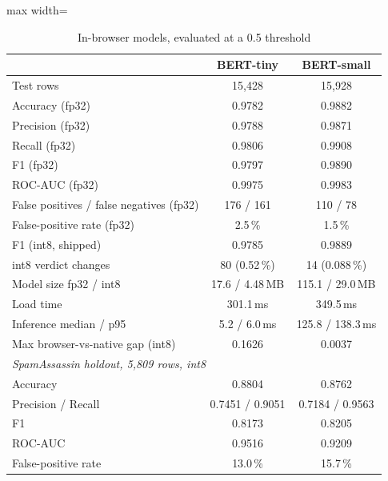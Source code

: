 \documentclass[conference]{IEEEtran}
\begin{document}
\begin{table}[t]
\centering
\caption{In-browser models, evaluated at a 0.5 threshold}
\label{tab:ondevice}
\begin{adjustbox}{max width=\columnwidth}
\begin{tabular}{lcc}
\toprule
 & BERT-tiny & BERT-small \\
\midrule
Test rows & 15,428 & 15,928 \\
Accuracy (fp32) & 0.9782 & 0.9882 \\
Precision (fp32) & 0.9788 & 0.9871 \\
Recall (fp32) & 0.9806 & 0.9908 \\
F1 (fp32) & 0.9797 & 0.9890 \\
ROC-AUC (fp32) & 0.9975 & 0.9983 \\
False positives / false negatives (fp32) & 176 / 161 & 110 / 78 \\
False-positive rate (fp32) & 2.5\,\% & 1.5\,\% \\
F1 (int8, shipped) & 0.9785 & 0.9889 \\
int8 verdict changes & 80 (0.52\,\%) & 14 (0.088\,\%) \\
Model size fp32 / int8 & 17.6 / 4.48\,MB & 115.1 / 29.0\,MB \\
Load time & 301.1\,ms & 349.5\,ms \\
Inference median / p95 & 5.2 / 6.0\,ms & 125.8 / 138.3\,ms \\
Max browser-vs-native gap (int8) & 0.1626 & 0.0037 \\
\midrule
\multicolumn{3}{l}{\emph{SpamAssassin holdout, 5,809 rows, int8}} \\
Accuracy & 0.8804 & 0.8762 \\
Precision / Recall & 0.7451 / 0.9051 & 0.7184 / 0.9563 \\
F1 & 0.8173 & 0.8205 \\
ROC-AUC & 0.9516 & 0.9209 \\
False-positive rate & 13.0\,\% & 15.7\,\% \\
\bottomrule
\end{tabular}
\end{adjustbox}
\end{table}
\end{document}
